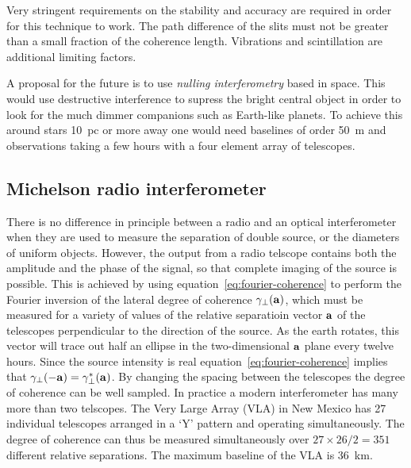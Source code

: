 Very stringent requirements on the stability and accuracy are required in order for this technique to work. The path difference of the slits must not be greater than a small fraction of the coherence length. %
Vibrations and scintillation are additional limiting factors.

A proposal for the future is to use {\it nulling interferometry} based in space. This would use destructive interference to supress the bright central object in order to look for the much dimmer companions such as Earth-like planets. To achieve this around stars 10~pc or more away one would need baselines of order 50~m and observations taking a few hours with a four element array of telescopes.

\subsection{Michelson radio interferometer}

There is no difference in principle between a radio and an optical interferometer when they are used to measure the separation of double source, or the diameters of uniform objects. However, the output from a radio telscope contains both the amplitude and the phase of the signal, so that complete imaging of the source is possible. This is achieved by using equation~\ref{eq:fourier-coherence} to perform the Fourier inversion of the lateral degree of coherence $\gamma_\perp({\bf a})$, which must be measured for a 
variety of values of the relative separatioin vector ${\bf a}$ of the telescopes perpendicular to the direction of the source. As the earth rotates, this vector will trace out half an ellipse in the two-dimensional ${\bf a}$ plane every twelve hours. Since the source intensity is real equation~\ref{eq:fourier-coherence} implies that $\gamma_\perp(-{\bf a})=\gamma_\perp^*({\bf a})$. By changing the spacing between the telescopes the degree of coherence can be well sampled. In practice a modern interferometer has many more than two telscopes. The Very Large Array (VLA) in New Mexico has 27 individual telescopes arranged in a `Y' pattern and operating simultaneously. The degree of coherence can thus be measured simultaneously over 
${27\times 26/2}=351$ different relative separations. The maximum baseline of the VLA is 36~km.

